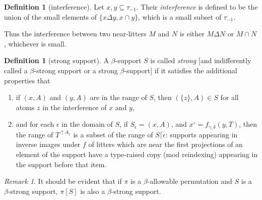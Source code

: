 \documentclass[112pt]{article}
\theoremstyle{definition}
\newtheorem{definition}[theorem]{Definition}
\theoremstyle{remark}
\newtheorem{remark}[theorem]{Remark}
\begin{document}
{

\begin{definition}[interference]
Let $x, y \subseteq \tau_{-1}$.
Their {\em interference\/} is defined to be the union of the small elements of $\{ x \Delta y, x \cap y \}$, which is a small subset of $\tau_{-1}$.
\end{definition}
Thus the interference between two near-litters $M$ and $N$ is either $M \Delta N$ or $M \cap N$, whichever is small.
\begin{definition}[strong support]\label{def:strong_support}
A $\beta$-support $S$ is called {\em strong\/} [and indifferently called a $\beta$-strong support or a strong $\beta$-support] if it satisfies the additional properties that

\begin{enumerate}

\item if $(x,A)$ and $(y,A)$ are in the range of $S$, then $(\{z\},A) \in S$ for all atoms $z$ in the interference of $x$ and $y$,

\item and for each $\epsilon$ in the domain of $S$, if $S_\epsilon = (x,A)$, and $x^\circ = f_{\gamma,\delta}(y,T)$, then the range of $T^{\uparrow A_1}$ is a subset of the range of $S \lceil \epsilon$:  supports appearing in inverse images under $f$ of litters which are near the first projections of an element of the support have a type-raised copy (mod reindexing) appearing in the support before that item.
\end{enumerate}
\end{definition}
}

\begin{remark}
It should be evident that if $\pi$ is a $\beta$-allowable permutation and $S$ is a $\beta$-strong support,
$\pi[S]$ is also a $\beta$-strong support.
\end{remark}
\end{document}
